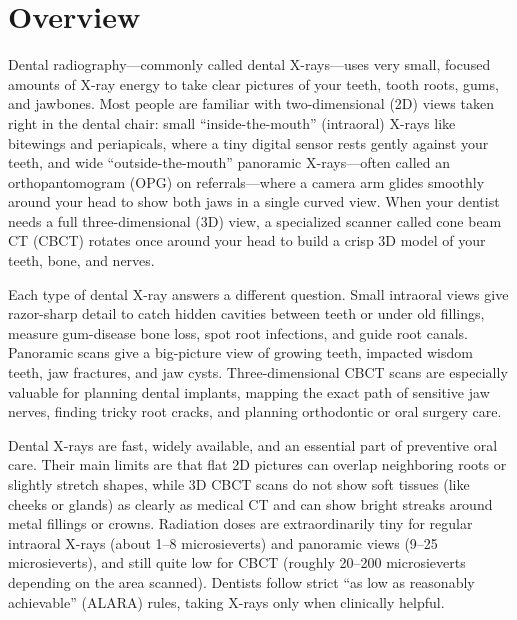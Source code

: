 \label{ch:infographic-dental-radiography}

\section{Overview}

Dental radiography---commonly called dental X-rays---uses very small, focused amounts of X-ray energy to take clear pictures of your teeth, tooth roots, gums, and jawbones. Most people are familiar with two-dimensional (2D) views taken right in the dental chair: small ``inside-the-mouth'' (intraoral) X-rays like bitewings and periapicals, where a tiny digital sensor rests gently against your teeth, and wide ``outside-the-mouth'' panoramic X-rays---often called an orthopantomogram (OPG) on referrals---where a camera arm glides smoothly around your head to show both jaws in a single curved view. When your dentist needs a full three-dimensional (3D) view, a specialized scanner called cone beam CT (CBCT) rotates once around your head to build a crisp 3D model of your teeth, bone, and nerves.

Each type of dental X-ray answers a different question. Small intraoral views give razor-sharp detail to catch hidden cavities between teeth or under old fillings, measure gum-disease bone loss, spot root infections, and guide root canals. Panoramic scans give a big-picture view of growing teeth, impacted wisdom teeth, jaw fractures, and jaw cysts. Three-dimensional CBCT scans are especially valuable for planning dental implants, mapping the exact path of sensitive jaw nerves, finding tricky root cracks, and planning orthodontic or oral surgery care.

Dental X-rays are fast, widely available, and an essential part of preventive oral care. Their main limits are that flat 2D pictures can overlap neighboring roots or slightly stretch shapes, while 3D CBCT scans do not show soft tissues (like cheeks or glands) as clearly as medical CT and can show bright streaks around metal fillings or crowns. Radiation doses are extraordinarily tiny for regular intraoral X-rays (about 1--8 microsieverts) and panoramic views (9--25 microsieverts), and still quite low for CBCT (roughly 20--200 microsieverts depending on the area scanned). Dentists follow strict ``as low as reasonably achievable'' (ALARA) rules, taking X-rays only when clinically helpful.

